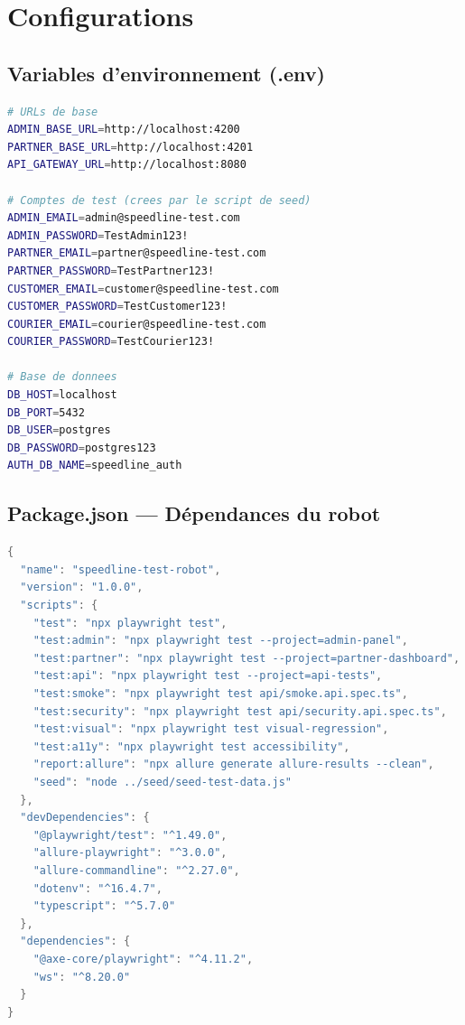 \chapter{Configurations}
\label{annexe:configurations}

\section{Variables d'environnement (.env)}

\begin{lstlisting}[language=bash, caption={.env.example --- Variables de configuration des tests}, label={lst:env}]
# URLs de base
ADMIN_BASE_URL=http://localhost:4200
PARTNER_BASE_URL=http://localhost:4201
API_GATEWAY_URL=http://localhost:8080

# Comptes de test (crees par le script de seed)
ADMIN_EMAIL=admin@speedline-test.com
ADMIN_PASSWORD=TestAdmin123!
PARTNER_EMAIL=partner@speedline-test.com
PARTNER_PASSWORD=TestPartner123!
CUSTOMER_EMAIL=customer@speedline-test.com
CUSTOMER_PASSWORD=TestCustomer123!
COURIER_EMAIL=courier@speedline-test.com
COURIER_PASSWORD=TestCourier123!

# Base de donnees
DB_HOST=localhost
DB_PORT=5432
DB_USER=postgres
DB_PASSWORD=postgres123
AUTH_DB_NAME=speedline_auth
\end{lstlisting}

\section{Package.json --- Dépendances du robot}

\begin{lstlisting}[language=Java, caption={package.json --- Scripts et dépendances npm}, label={lst:package-json}]
{
  "name": "speedline-test-robot",
  "version": "1.0.0",
  "scripts": {
    "test": "npx playwright test",
    "test:admin": "npx playwright test --project=admin-panel",
    "test:partner": "npx playwright test --project=partner-dashboard",
    "test:api": "npx playwright test --project=api-tests",
    "test:smoke": "npx playwright test api/smoke.api.spec.ts",
    "test:security": "npx playwright test api/security.api.spec.ts",
    "test:visual": "npx playwright test visual-regression",
    "test:a11y": "npx playwright test accessibility",
    "report:allure": "npx allure generate allure-results --clean",
    "seed": "node ../seed/seed-test-data.js"
  },
  "devDependencies": {
    "@playwright/test": "^1.49.0",
    "allure-playwright": "^3.0.0",
    "allure-commandline": "^2.27.0",
    "dotenv": "^16.4.7",
    "typescript": "^5.7.0"
  },
  "dependencies": {
    "@axe-core/playwright": "^4.11.2",
    "ws": "^8.20.0"
  }
}
\end{lstlisting}

